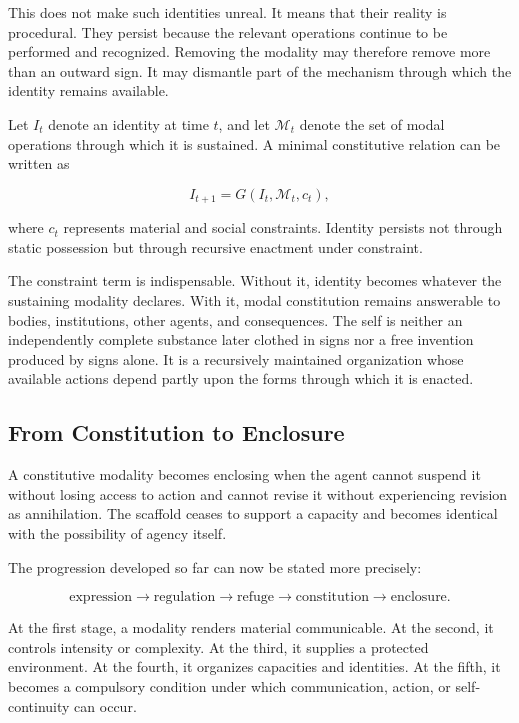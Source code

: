 \documentclass[11pt]{article}
\newcommand{\modality}{\mathcal{M}}
\begin{document}
This does not make such identities unreal. It means that their reality is
procedural. They persist because the relevant operations continue to be
performed and recognized. Removing the modality may therefore remove more
than an outward sign. It may dismantle part of the mechanism through which the
identity remains available.

Let \(I_t\) denote an identity at time \(t\), and let
\(\modality_t\) denote the set of modal operations through which it is
sustained. A minimal constitutive relation can be written as

\begin{equation}
  I_{t+1}
  =
  G(I_t,\modality_t,c_t),
  \label{eq:identity-recursion}
\end{equation}

where \(c_t\) represents material and social constraints. Identity persists
not through static possession but through recursive enactment under
constraint.

The constraint term is indispensable. Without it, identity becomes whatever
the sustaining modality declares. With it, modal constitution remains
answerable to bodies, institutions, other agents, and consequences. The self
is neither an independently complete substance later clothed in signs nor a
free invention produced by signs alone. It is a recursively maintained
organization whose available actions depend partly upon the forms through
which it is enacted.

\subsection{From Constitution to Enclosure}

A constitutive modality becomes enclosing when the agent cannot suspend it
without losing access to action and cannot revise it without experiencing
revision as annihilation. The scaffold ceases to support a capacity and
becomes identical with the possibility of agency itself.

The progression developed so far can now be stated more precisely:

\begin{equation}
  \text{expression}
  \longrightarrow
  \text{regulation}
  \longrightarrow
  \text{refuge}
  \longrightarrow
  \text{constitution}
  \longrightarrow
  \text{enclosure}.
  \label{eq:modal-progression}
\end{equation}

At the first stage, a modality renders material communicable. At the second,
it controls intensity or complexity. At the third, it supplies a protected
environment. At the fourth, it organizes capacities and identities. At the
fifth, it becomes a compulsory condition under which communication, action,
or self-continuity can occur.
\end{document}

